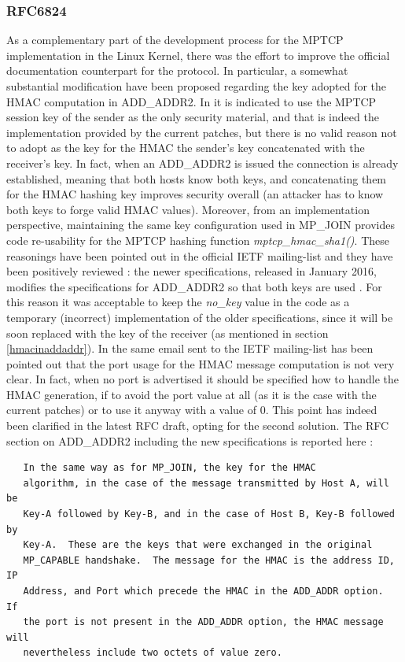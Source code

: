 \subsubsection{RFC6824}
As a complementary part of the development process for the MPTCP implementation in the Linux Kernel, there was the effort to improve the official documentation counterpart for the protocol. In particular, a somewhat substantial modification have been proposed regarding the key adopted for the HMAC computation in ADD\_ADDR2. In  \cite{rfc6824bis04} it is indicated to use the MPTCP session key of the sender as the only security material, and that is indeed the implementation provided by the current patches, but there is no valid reason not to adopt as the key for the HMAC the sender's key concatenated with the receiver's key. In fact, when an ADD\_ADDR2 is issued the connection is already established, meaning that both hosts know both keys, and concatenating them for the HMAC hashing key improves security overall (an attacker has to know both keys to forge valid HMAC values). Moreover, from an implementation perspective, maintaining the same key configuration used in MP\_JOIN provides code re-usability for the MPTCP hashing function \textit{mptcp\_hmac\_sha1()}.
These reasonings have been pointed out in the official IETF mailing-list and they have been positively reviewed \cite{maillist}: the newer specifications, released in January 2016, modifies the specifications for ADD\_ADDR2 so that both keys are used \cite{rfc6824bis05}. For this reason it was acceptable to keep the \textit{no\_key} value in the code as a temporary (incorrect) implementation of the older specifications, since it will be soon replaced with the key of the receiver (as mentioned in section \ref{hmacinaddaddr}).
In the same email sent to the IETF mailing-list has been pointed out that the port usage for the HMAC message computation is not very clear. In fact, when no port is advertised it should be specified how to handle the HMAC generation, if to avoid the port value at all (as it is the case with the current patches) or to use it anyway with a value of 0. This point has indeed been clarified in the latest RFC draft, opting for the second solution. The RFC section on ADD\_ADDR2 including the new specifications is reported here \cite{rfc6824bis05}:

\begin{verbatim}
   In the same way as for MP_JOIN, the key for the HMAC
   algorithm, in the case of the message transmitted by Host A, will be
   Key-A followed by Key-B, and in the case of Host B, Key-B followed by
   Key-A.  These are the keys that were exchanged in the original
   MP_CAPABLE handshake.  The message for the HMAC is the address ID, IP
   Address, and Port which precede the HMAC in the ADD_ADDR option.  If
   the port is not present in the ADD_ADDR option, the HMAC message will
   nevertheless include two octets of value zero.
\end{verbatim}

